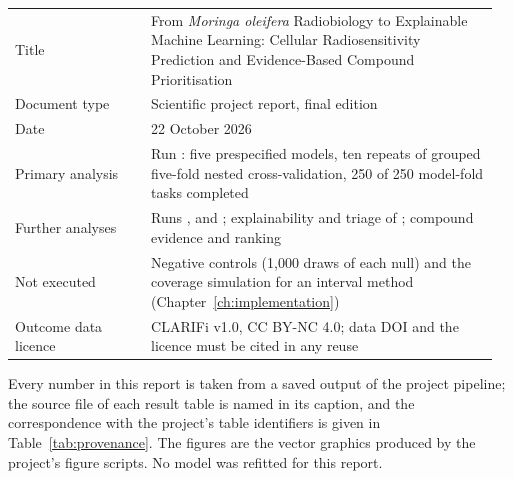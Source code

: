 \thispagestyle{empty}
\vspace*{\fill}
\begingroup\small
{}\par\smallskip
\noindent\begin{tabular}{@{}L{0.27\linewidth}L{0.69\linewidth}@{}}
  \toprule
  Title & From \textit{Moringa oleifera} Radiobiology to Explainable Machine Learning:
    Cellular Radiosensitivity Prediction and Evidence-Based Compound Prioritisation \\
  Document type & Scientific project report, final edition \\
  Date & 22 October 2026 \\
  Primary analysis & Run : five prespecified models, ten repeats of
    grouped five-fold nested cross-validation, 250 of 250 model-fold tasks completed \\
  Further analyses & Runs ,  and ;
    explainability and triage of ; compound evidence and ranking
     \\
  Not executed & Negative controls (1,000 draws of each null) and the coverage
    simulation for an interval method (Chapter~\ref{ch:implementation}) \\
  Outcome data licence & CLARIFi v1.0, CC BY-NC 4.0; data DOI
     and the licence must be cited in any reuse \\
  \bottomrule
\end{tabular}

\medskip
\noindent Every number in this report is taken from a saved output of the project
pipeline; the source file of each result table is named in its caption, and the
correspondence with the project's table identifiers is given in
Table~\ref{tab:provenance}. The figures are the vector graphics produced by the
project's figure scripts. No model was refitted for this report.
\par\endgroup
\clearpage
